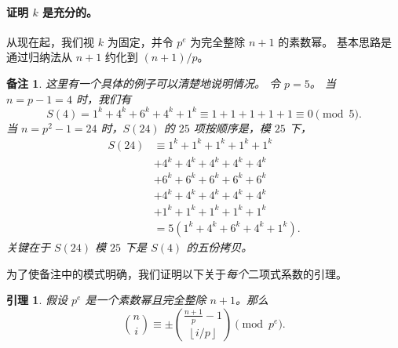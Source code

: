 \documentclass[11pt]{article}
\theoremstyle{claimstyle}
\newtheorem{lemma}{引理}
\theoremstyle{remarkstyle}
\newtheorem{remark}{备注}
\begin{document}
\paragraph{证明 $k$ 是充分的。}
从现在起，我们视 $k$ 为固定，并令 $p^e$ 为完全整除 $n+1$ 的素数幂。
基本思路是通过归纳法从 $n+1$ 约化到 $(n+1)/p$。

\begin{remark}
  这里有一个具体的例子可以清楚地说明情况。
  令 $p = 5$。
  当 $n = p-1 = 4$ 时，我们有
  \[ S(4) = 1^k + 4^k + 6^k + 4^k + 1^k \equiv 1 + 1 + 1 + 1 + 1 \equiv 0 \pmod 5. \]
  当 $n = p^2-1 = 24$ 时，$S(24)$ 的 $25$ 项按顺序是，模 $25$ 下，
  \begin{align*}
    S(24) &\equiv 1^k + 1^k + 1^k + 1^k + 1^k\\
    &+ 4^k + 4^k + 4^k + 4^k + 4^k \\
    &+ 6^k + 6^k + 6^k + 6^k + 6^k \\
    &+ 4^k + 4^k + 4^k + 4^k + 4^k \\
    &+ 1^k + 1^k + 1^k + 1^k + 1^k \\
    &= 5(1^k + 4^k + 6^k + 4^k + 1^k).
  \end{align*}
  关键在于 $S(24)$ 模 $25$ 下是 $S(4)$ 的五份拷贝。
\end{remark}

为了使备注中的模式明确，我们证明以下关于\emph{每个}二项式系数的引理。

\begin{lemma}
  假设 $p^e$ 是一个素数幂且完全整除 $n+1$。那么
  \[ \binom{n}{i} \equiv \pm \binom{\frac{n+1}{p}-1}{\left\lfloor i/p \right\rfloor} \pmod{p^e}. \]
\end{lemma}
\end{document}
